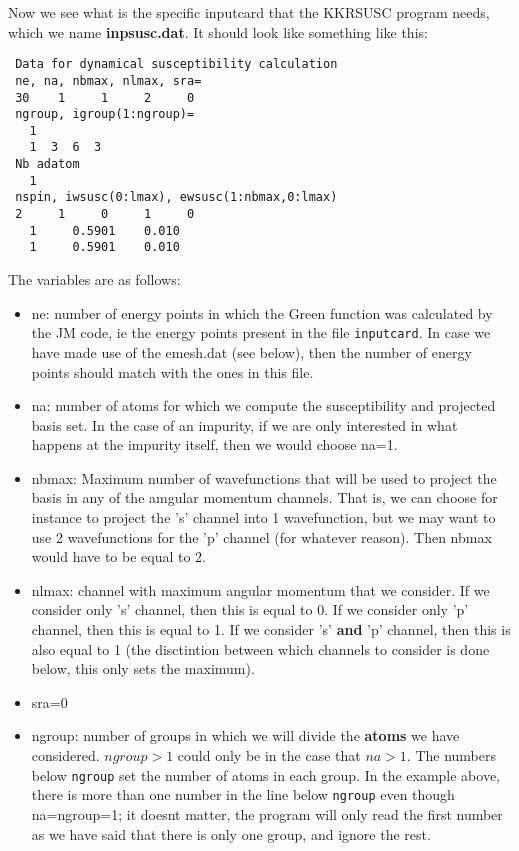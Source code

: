 \documentclass[11pt,fleqn]{book} %
\begin{document}
Now we see what is the specific inputcard that
the KKRSUSC program needs,
which we name \textbf{inpsusc.dat}.
It should look like something like this:
\begin{VBox}
\begin{verbatim}
 Data for dynamical susceptibility calculation
 ne, na, nbmax, nlmax, sra=
 30    1     1     2     0
 ngroup, igroup(1:ngroup)=
   1
   1  3  6  3
 Nb adatom
   1
 nspin, iwsusc(0:lmax), ewsusc(1:nbmax,0:lmax)
 2     1     0     1     0
   1     0.5901    0.010
   1     0.5901    0.010
\end{verbatim}
\end{VBox}
The variables are as follows:
\begin{itemize}

\item ne: number of energy points in which the Green function was calculated by
the JM code, ie the energy points present in the file \verb|inputcard|.
In case we have made use of the emesh.dat (see below), then the number of energy points
should match with the ones in this file.

\item na: number of atoms for which we compute the susceptibility and projected basis set.
In the case of an impurity, if we are only interested in what happens at the impurity
itself, then we would choose na=1.

\item nbmax: Maximum number of wavefunctions that will be used to project the basis in
any of the amgular momentum channels. That is, we can choose for instance to project
the 's' channel into 1 wavefunction, but we may want to use 2 wavefunctions for
the 'p' channel (for whatever reason). Then nbmax would have to be equal to 2.

\item nlmax: channel with maximum angular momentum that we consider.
If we consider only 's' channel, then this is equal to 0. If we consider only 'p'
channel, then this is equal to 1. If we consider 's' \textbf{and} 'p' channel, then this is also
equal to 1 (the disctintion between which channels to consider is done below, this
only sets the maximum).

\item sra=0

\item ngroup: number of groups in which we will divide the \textbf{atoms} we have considered.
$ngroup>1$ could only be in the case that $na>1$.  The numbers below \verb|ngroup|
set the number of atoms in each group. In the example above, there is more
than one number in the line below \verb|ngroup|
even though na=ngroup=1; it doesnt matter, the program will only read the first number
as we have said that there is only one group, and ignore the rest.


\end{itemize}
\end{document}
